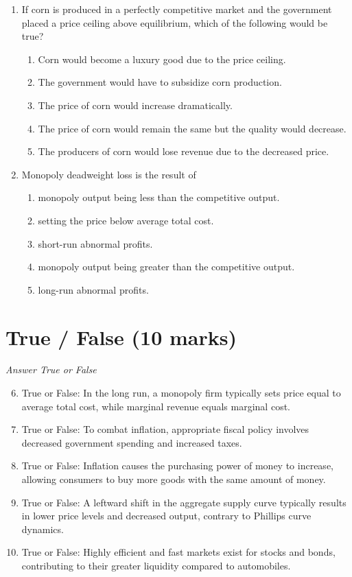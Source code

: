 \documentclass[12pt]{article}
\begin{document}
\begin{enumerate}[label=\arabic*.]
\begin{enumerate}[label=(\alph*)]
\end{enumerate}
\item If corn is produced in a perfectly competitive market and the government placed a price ceiling above equilibrium, which of the following would be true?
\begin{enumerate}[label=(\alph*)]
    \item Corn would become a luxury good due to the price ceiling.
    \item The government would have to subsidize corn production.
    \item The price of corn would increase dramatically.
    \item The price of corn would remain the same but the quality would decrease.
    \item The producers of corn would lose revenue due to the decreased price.
\end{enumerate}
\item Monopoly deadweight loss is the result of
\begin{enumerate}[label=(\alph*)]
    \item monopoly output being less than the competitive output.
    \item setting the price below average total cost.
    \item short-run abnormal profits.
    \item monopoly output being greater than the competitive output.
    \item long-run abnormal profits.
\end{enumerate}
\end{enumerate}

\section*{True / False (10 marks)}
\textit{Answer True or False}
\begin{enumerate}[label=\arabic*.]
\setcounter{enumi}{5}
\item True or False: In the long run, a monopoly firm typically sets price equal to average total cost, while marginal revenue equals marginal cost.
\item True or False: To combat inflation, appropriate fiscal policy involves decreased government spending and increased taxes.
\item True or False: Inflation causes the purchasing power of money to increase, allowing consumers to buy more goods with the same amount of money.
\item True or False: A leftward shift in the aggregate supply curve typically results in lower price levels and decreased output, contrary to Phillips curve dynamics.
\item True or False: Highly efficient and fast markets exist for stocks and bonds, contributing to their greater liquidity compared to automobiles.
\end{enumerate}
\end{document}
